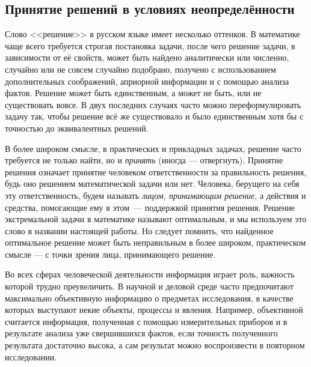 
\subsection{Принятие решений в условиях неопределённости}
\label{sec:basic_intro}

Слово <<решение>> в русском языке имеет несколько оттенков. В математике чаще всего требуется строгая постановка задачи, после чего решение задачи, в зависимости от её свойств, может быть найдено аналитически или численно, случайно или не совсем случайно подобрано, получено с использованием дополнительных соображений,  априорной информации и с помощью анализа фактов. Решение может быть единственным, а может не быть, или не существовать вовсе. В двух последних случаях часто можно переформулировать задачу так, чтобы решение всё же существовало и было единственным хотя бы с точностью до эквивалентных решений. 

В более широком смысле, в практических и прикладных задачах, решение часто требуется не только найти, но и {\sl принять} (иногда --- отвергнуть). Принятие решения означает принятие человеком ответственности за правильность решения, будь оно решением математической задачи или нет. Человека, берущего на себя эту ответственность, будем называть {\sl лицом, принимающим решение}, а действия и средства, помогающие ему в этом~---  поддержкой принятия решения. Решение экстремальной задачи в математике называют оптимальным, и мы используем это слово в названии настоящей работы. Но следует помнить, что найденное оптимальное решение может быть неправильным в более широком, практическом смысле --- с точки зрения лица, принимающего решение. 

Во всех сферах человеческой деятельности информация играет роль, важность которой трудно преувеличить. В научной и деловой среде часто предпочитают максимально объективную информацию о предметах исследования, в качестве которых выступают некие объекты, процессы и явления. Например, объективной считается информация, полученная с помощью измерительных приборов и в результате анализа уже свершившихся фактов, если точность полученного результата достаточно высока, а сам результат можно воспроизвести в повторном исследовании. 

